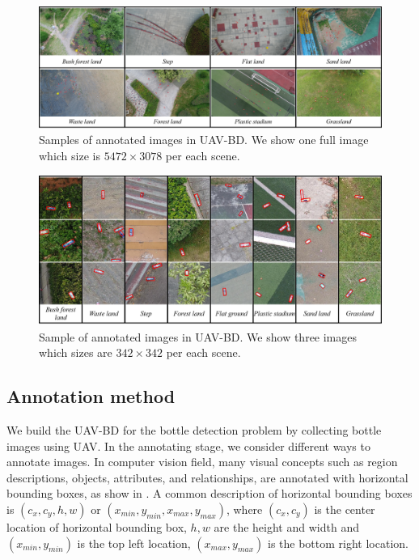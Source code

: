 \begin{figure}
	\includegraphics[width=\linewidth]{images/UAV-BD1.png}
	\caption{Samples of annotated images in UAV-BD. We show one full image which size is $ 5472\times 3078 $ per each scene.}
	\label{fig:dataset-original-image}
\end{figure}



\begin{figure}
	\includegraphics[width=\linewidth]{images/UAV-BD2.png}
	\caption{Sample of annotated images in UAV-BD. We show three images which sizes are $ 342\times 342 $ per each scene.}
	\label{fig:dataset-cut-image}
\end{figure}



\subsection{Annotation method}
\label{ssec:annotation_method}




We build the UAV-BD for the bottle detection problem by collecting bottle images using UAV. In the annotating stage, we consider different ways to annotate images. In computer vision field, many visual concepts such as region descriptions, objects, attributes, and relationships, are annotated with horizontal bounding boxes, as show in \cite{DOTA, boundingbox}. A common description of horizontal bounding boxes is $(c_x, c_y, h, w)$ or $ (x_{min}, y_{min}, x_{max}, y_{max}) $, where $(c_x, c_y)$ is the center location of horizontal bounding box, $h, w$ are the height and width and $ (x_{min}, y_{min}) $ is the top left location, $ (x_{max}, y_{max}) $ is the bottom right location\cite{DOTA}. 

